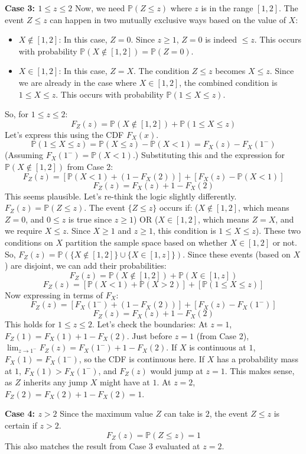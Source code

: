 \documentclass[11pt]{article}
\theoremstyle{definition}
\theoremstyle{remark}
\newcommand{\Prob}{\mathbb{P}}
\begin{document}
\textbf{Case 3: $1 \leq z \leq 2$}
Now, we need $\Prob(Z \leq z)$ where $z$ is in the range $[1, 2]$. The event $Z \leq z$ can happen in two mutually exclusive ways based on the value of $X$:
\begin{itemize}
    \item $X \notin [1, 2]$: In this case, $Z = 0$. Since $z \geq 1$, $Z=0$ is indeed $\leq z$. This occurs with probability $\Prob(X \notin [1, 2]) = \Prob(Z=0)$.
    \item $X \in [1, 2]$: In this case, $Z = X$. The condition $Z \leq z$ becomes $X \leq z$. Since we are already in the case where $X \in [1, 2]$, the combined condition is $1 \leq X \leq z$. This occurs with probability $\Prob(1 \leq X \leq z)$.
\end{itemize}
So, for $1 \leq z \leq 2$:
\[ F_Z(z) = \Prob(X \notin [1, 2]) + \Prob(1 \leq X \leq z) \]
Let's express this using the CDF $F_X(x)$.
\[ \Prob(1 \leq X \leq z) = \Prob(X \leq z) - \Prob(X < 1) = F_X(z) - F_X(1^-) \]
(Assuming $F_X(1^-) = \Prob(X < 1)$.)
Substituting this and the expression for $\Prob(X \notin [1, 2])$ from Case 2:
\[ F_Z(z) = [\Prob(X < 1) + (1 - F_X(2))] + [F_X(z) - \Prob(X < 1)] \]
\[ F_Z(z) = F_X(z) + 1 - F_X(2) \]
This seems plausible. Let's re-think the logic slightly differently.
$F_Z(z) = \Prob(Z \leq z)$.
The event $\{Z \leq z\}$ occurs if:
($X \notin [1, 2]$, which means $Z=0$, and $0 \leq z$ is true since $z \ge 1$)
OR
($X \in [1, 2]$, which means $Z=X$, and we require $X \leq z$. Since $X \ge 1$ and $z \ge 1$, this condition is $1 \leq X \leq z$).
These two conditions on $X$ partition the sample space based on whether $X \in [1,2]$ or not.
So, $F_Z(z) = \Prob(\{X \notin [1, 2]\} \cup \{X \in [1, z]\})$.
Since these events (based on $X$) are disjoint, we can add their probabilities:
\[ F_Z(z) = \Prob(X \notin [1, 2]) + \Prob(X \in [1, z]) \]
\[ F_Z(z) = [\Prob(X < 1) + \Prob(X > 2)] + [\Prob(1 \leq X \leq z)] \]
Now expressing in terms of $F_X$:
\[ F_Z(z) = [F_X(1^-) + (1 - F_X(2))] + [F_X(z) - F_X(1^-)] \]
\[ F_Z(z) = F_X(z) + 1 - F_X(2) \]
This holds for $1 \leq z \leq 2$. Let's check the boundaries:
At $z=1$, $F_Z(1) = F_X(1) + 1 - F_X(2)$.
Just before $z=1$ (from Case 2), $\lim_{z \to 1^-} F_Z(z) = F_X(1^-) + 1 - F_X(2)$.
If $X$ is continuous at $1$, $F_X(1) = F_X(1^-)$, so the CDF is continuous here. If $X$ has a probability mass at $1$, $F_X(1) > F_X(1^-)$, and $F_Z(z)$ would jump at $z=1$. This makes sense, as $Z$ inherits any jump $X$ might have at $1$.
At $z=2$, $F_Z(2) = F_X(2) + 1 - F_X(2) = 1$.

\textbf{Case 4: $z > 2$}
Since the maximum value $Z$ can take is $2$, the event $Z \leq z$ is certain if $z > 2$.
\[ F_Z(z) = \Prob(Z \leq z) = 1 \]
This also matches the result from Case 3 evaluated at $z=2$.
\end{document}
